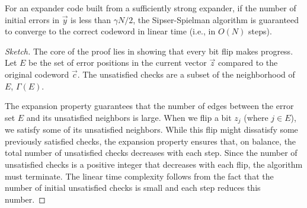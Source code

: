 \begin{theorem}
For an expander code built from a sufficiently strong expander, if the number of initial errors in $\vec{y}$ is less than $\gamma N/2$, the Sipser-Spielman algorithm is guaranteed to converge to the correct codeword in linear time (i.e., in $O(N)$ steps).
\end{theorem}
\begin{proof}[Sketch]
The core of the proof lies in showing that every bit flip makes progress. Let $E$ be the set of error positions in the current vector $\vec{z}$ compared to the original codeword $\vec{c}$. The unsatisfied checks are a subset of the neighborhood of $E$, $\Gamma(E)$.

The expansion property guarantees that the number of edges between the error set $E$ and its unsatisfied neighbors is large. When we flip a bit $z_j$ (where $j \in E$), we satisfy some of its unsatisfied neighbors. While this flip might dissatisfy some previously satisfied checks, the expansion property ensures that, on balance, the total number of unsatisfied checks decreases with each step. Since the number of unsatisfied checks is a positive integer that decreases with each flip, the algorithm must terminate. The linear time complexity follows from the fact that the number of initial unsatisfied checks is small and each step reduces this number.
\end{proof}
